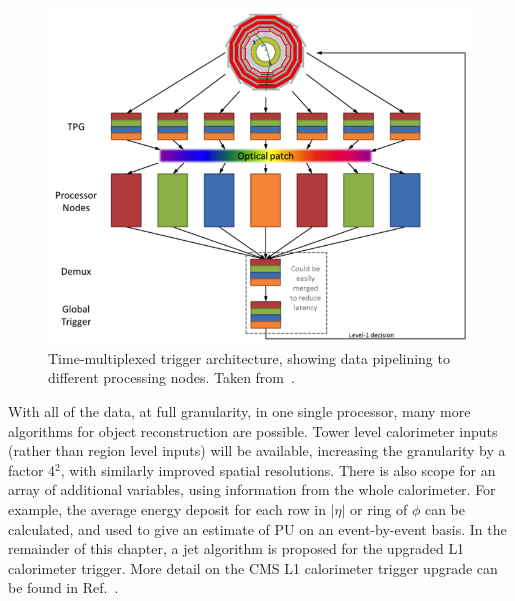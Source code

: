 \begin{figure}[h]
\begin{center}
  \includegraphics[scale=0.8]{Figures/l1jets/TMTrigger.png}

\caption{Time-multiplexed trigger architecture, showing data pipelining to different processing nodes. Taken from~\cite{RoseTrig}.}
\label{fig:TMTrig}
\end{center}
\end{figure}


With all of the data, at full granularity, in one single processor, many more algorithms for object reconstruction are possible. 
Tower level calorimeter inputs (rather than region level inputs) will be available, increasing the granularity by a factor 4$^{2}$, with similarly improved spatial resolutions.
There is also scope for an array of additional variables, using information from the whole calorimeter. For example, the average energy deposit for each row in $|\eta|$ or ring of $\phi$ can be calculated, and used to give an estimate of \ac{PU} on an event-by-event basis.
In the remainder of this chapter, a jet algorithm is proposed for the upgraded \ac{L1} calorimeter trigger.
More detail on the CMS \ac{L1} calorimeter trigger upgrade can be found in Ref.~\cite{1748-0221-9-01-C01006}.


%        

